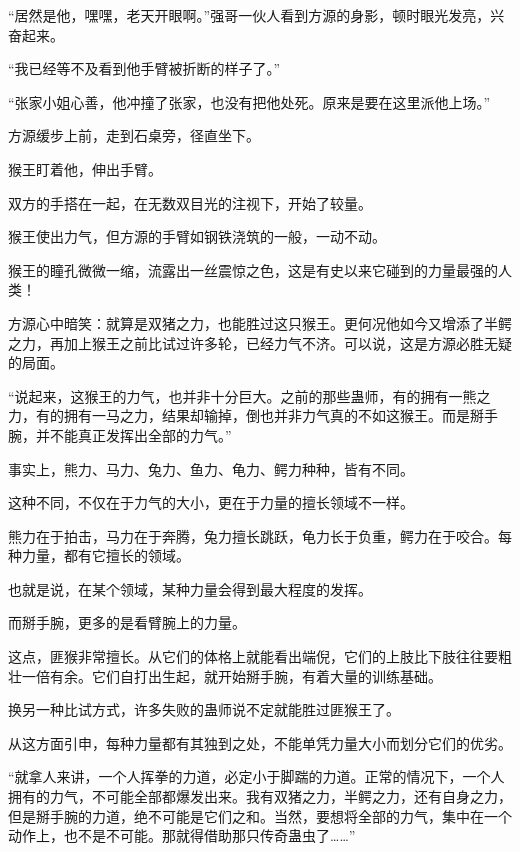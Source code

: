 
\begin{this_body}



“居然是他，嘿嘿，老天开眼啊。”强哥一伙人看到方源的身影，顿时眼光发亮，兴奋起来。

“我已经等不及看到他手臂被折断的样子了。”

“张家小姐心善，他冲撞了张家，也没有把他处死。原来是要在这里派他上场。”

方源缓步上前，走到石桌旁，径直坐下。

猴王盯着他，伸出手臂。

双方的手搭在一起，在无数双目光的注视下，开始了较量。

猴王使出力气，但方源的手臂如钢铁浇筑的一般，一动不动。

猴王的瞳孔微微一缩，流露出一丝震惊之色，这是有史以来它碰到的力量最强的人类！

方源心中暗笑：就算是双猪之力，也能胜过这只猴王。更何况他如今又增添了半鳄之力，再加上猴王之前比试过许多轮，已经力气不济。可以说，这是方源必胜无疑的局面。

“说起来，这猴王的力气，也并非十分巨大。之前的那些蛊师，有的拥有一熊之力，有的拥有一马之力，结果却输掉，倒也并非力气真的不如这猴王。而是掰手腕，并不能真正发挥出全部的力气。”

事实上，熊力、马力、兔力、鱼力、龟力、鳄力种种，皆有不同。

这种不同，不仅在于力气的大小，更在于力量的擅长领域不一样。

熊力在于拍击，马力在于奔腾，兔力擅长跳跃，龟力长于负重，鳄力在于咬合。每种力量，都有它擅长的领域。

也就是说，在某个领域，某种力量会得到最大程度的发挥。

而掰手腕，更多的是看臂腕上的力量。

这点，匪猴非常擅长。从它们的体格上就能看出端倪，它们的上肢比下肢往往要粗壮一倍有余。它们自打出生起，就开始掰手腕，有着大量的训练基础。

换另一种比试方式，许多失败的蛊师说不定就能胜过匪猴王了。

从这方面引申，每种力量都有其独到之处，不能单凭力量大小而划分它们的优劣。

“就拿人来讲，一个人挥拳的力道，必定小于脚踹的力道。正常的情况下，一个人拥有的力气，不可能全部都爆发出来。我有双猪之力，半鳄之力，还有自身之力，但是掰手腕的力道，绝不可能是它们之和。当然，要想将全部的力气，集中在一个动作上，也不是不可能。那就得借助那只传奇蛊虫了……”


\end{this_body}
